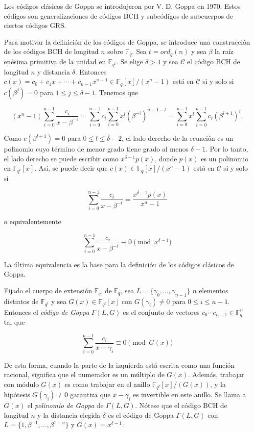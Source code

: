 Los códigos clásicos de Goppa se introdujeron por V. D. Goppa en 1970. Estos códigos son generalizaciones de códigos BCH y subcódigos de subcuerpos de ciertos códigos GRS.

Para motivar la definición de los códigos de Goppa, se introduce una construcción de los códigos BCH de longitud $n$ sobre $\mathbb{F}_q$. Sea $t = ord_q(n)$ y sea $\beta$ la raíz enésima primitiva de la unidad en $\mathbb{F}_{q^t}$. Se elige $\delta > 1$ y sea $\mathcal{C}$ el código BCH de longitud $n$ y distancia $\delta$. Entonces $c(x) = c_0 + c_1x + \cdots + c_{n-1}x^{n-1} \in \mathbb{F}_q [x] / (x^n - 1)$ está en $\mathcal{C}$ si y solo si $c(\beta^j) = 0$ para $1 \leq j \leq \delta - 1$. Tenemos que 

$$(x^n - 1) \sum_{i=0}^{n-1} \frac{c_i}{x - \beta ^{-i}} = \sum_{i=0}^{n-1} c_i \sum_{l=0}^{n-1} x^l \left( \beta ^{-i} \right) ^{n-1-l} = \sum_{l=0}^{n-1} x^l \sum_{i=0}^{n-1} c_i \left( \beta^{l+1} \right) ^i.$$

Como $c(\beta^{l+1}) = 0$ para $0 \leq l \leq \delta - 2$, el lado derecho de la ecuación es un polinomio cuyo término de menor grado tiene grado al menos $\delta - 1$. Por lo tanto, el lado derecho se puede escribir como $x^{\delta - 1} p(x)$, donde $p(x)$ es un polinomio en $\mathbb{F}_{q^t}[x]$. Así, se puede decir que $c(x) \in \mathbb{F}_q[x] / (x^n - 1)$ está en $\mathcal{C}$ si y solo si 

$$\sum_{i=0}^{n-1} \frac{c_i}{x - \beta ^{-i}} = \frac{x^{\delta - 1} p(x)}{x^n - 1}$$

o equivalentemente

$$\sum_{i=0}^{n-1} \frac{c_i}{x - \beta ^{-i}} \equiv 0 \pmod{x^{\delta - 1}}$$

La última equivalencia es la base para la definición de los códigos clásicos de Goppa.

Fijado el cuerpo de extensión $\mathbb{F}_{q^t}$ de $\mathbb{F}_q$, sea $L = \{ \gamma_0, ..., \gamma_{n-1} \}$ $n$ elementos distintos de $\mathbb{F}_{q^t}$ y sea $G(x) \in \mathbb{F}_{q^t}[x]$ con $G(\gamma_i) \neq 0$ para $0 \leq i \leq n - 1$. Entonces el \emph{código de Goppa} $\Gamma (L,G)$ es el conjunto de vectores $c_0 \cdots c_{n-1} \in \mathbb{F}_q^n$ tal que 

\begin{equation}
    \label{definicion_goppa}
    \sum_{i=0}^{n-1} \frac{c_i}{x - \gamma_i} \equiv 0 \pmod{G(x)}
\end{equation}

De esta forma, cuando la parte de la izquierda está escrita como una función racional, significa que el numerador es un múltiplo de $G(x)$. Además, trabajar con módulo $G(x)$ es como trabajar en el anillo $\mathbb{F}_{q^t}[x]/(G(x))$, y la hipótesis $G(\gamma_i) \neq 0$ garantiza que $x - \gamma_i$ es invertible en este anillo. Se llama a $G(x)$ el \emph{polinomio de Goppa} de $\Gamma (L,G)$. Nótese que el código BCH de longitud $n$ y la distancia elegida $\delta$ es el código de Goppa $\Gamma (L,G)$ con $L = \{ 1, \beta^{-1}, ..., \beta^{1-n} \}$ y $G(x) = x^{\delta - 1}$.

